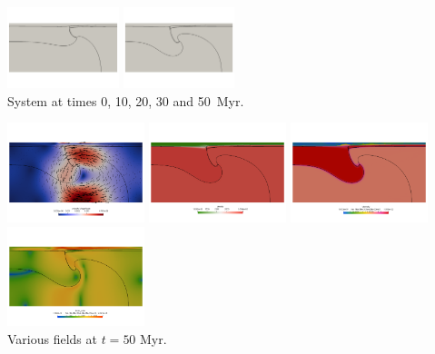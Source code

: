 \begin{center}
\includegraphics[width=3.25cm]{python_codes/fieldstone_118/results/case1/d}
\includegraphics[width=3.25cm]{python_codes/fieldstone_118/results/case1/e}\\
{\captionfont System at times 0, 10, 20, 30 and 50~Myr.}
\end{center}


\begin{center}
\includegraphics[width=4cm]{python_codes/fieldstone_118/results/case1/vel}
\includegraphics[width=4cm]{python_codes/fieldstone_118/results/case1/rho}
\includegraphics[width=4cm]{python_codes/fieldstone_118/results/case1/eta}
\includegraphics[width=4cm]{python_codes/fieldstone_118/results/case1/sr}\\
{\captionfont Various fields at $t=50$ Myr.}
\end{center}

